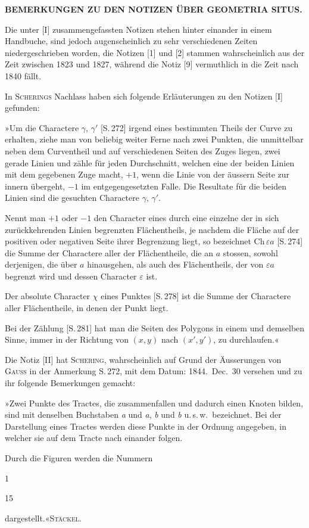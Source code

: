 \clearpage{}

\begin{center}
\textbf{BEMERKUNGEN ZU DEN NOTIZEN ÜBER GEOMETRIA SITUS.}
\end{center}

Die unter [I] zusammengefassten Notizen stehen hinter einander in einem
Handbuche, sind jedoch augenscheinlich zu sehr verschiedenen Zeiten
niedergeschrieben worden, die Notizen [1] und [2] stammen wahrscheinlich
aus der Zeit zwischen 1823 und 1827, während die Notiz [9] vermuthlich in
die Zeit nach 1840 fällt.

In \textsc{Scherings} Nachlass haben sich folgende Erläuterungen zu den Notizen
[I] gefunden:

»Um die Charactere $\gamma$, $\gamma'$ [S.\,272] irgend eines bestimmten
Theils der Curve zu erhalten, ziehe man von beliebig weiter Ferne nach
zwei Punkten, die unmittelbar neben dem Curventheil und auf verschiedenen
Seiten des Zuges liegen, zwei gerade Linien und zähle für jeden
Durchschnitt, welchen eine der beiden Linien mit dem gegebenen Zuge
macht, $+1$, wenn die Linie von der äussern Seite zur innern übergeht,
$-1$ im entgegengesetzten Falle. Die Resultate für die beiden Linien sind
die gesuchten Charactere $\gamma$, $\gamma'$.

Nennt man $+1$ oder $-1$ den Character eines durch eine einzelne der in
sich zurückkehrenden Linien begrenzten Flächentheils, je nachdem die
Fläche auf der positiven oder negativen Seite ihrer Begrenzung liegt, so
bezeichnet $\mathrm{Ch}\,\varepsilon a$ [S.\,274] die Summe der
Charactere aller der Flächentheile, die an $a$ stossen, sowohl derjenigen,
die über $a$ hinausgehen, als auch des Flächentheils, der von
$\varepsilon a$ begrenzt wird und dessen Character $\varepsilon$ ist.

Der absolute Character $\chi$ eines Punktes [S.\,278] ist die Summe der
Charactere aller Flächentheile, in denen der Punkt liegt.

Bei der Zählung [S.\,281] hat man die Seiten des Polygons in einem und
demselben Sinne, immer in der Richtung von $(x, y)$ nach $(x', y')$, zu
durchlaufen.«

Die Notiz [II] hat \textsc{Schering}, wahrscheinlich auf Grund der Äusserungen
von \textsc{Gauss} in der Anmerkung S.\,272, mit dem Datum: 1844.\ Dec.\ 30
versehen und zu ihr folgende Bemerkungen gemacht:

»Zwei Punkte des Tractes, die zusammenfallen und dadurch einen Knoten
bilden, sind mit denselben Buchstaben \emph{a} und \emph{a}, \emph{b} und
\emph{b} u.\,s.\,w.\ bezeichnet. Bei der Darstellung eines Tractes werden
diese Punkte in der Ordnung angegeben, in welcher sie auf dem Tracte nach
einander folgen.

Durch die Figuren werden die Nummern

\begin{center}
1    

15
\end{center}

dargestellt.«\hfill \textsc{Stäckel}.
